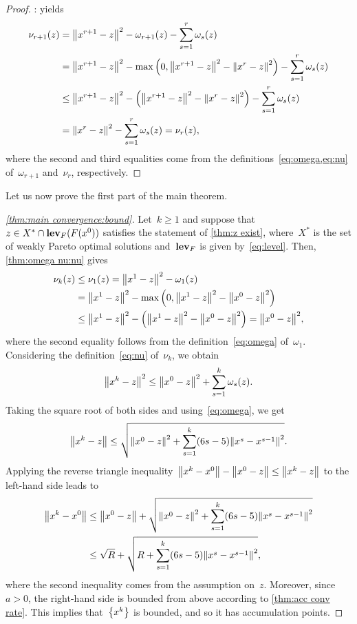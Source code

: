 \documentclass[../main]{subfiles}
\begin{document}
\begin{proof}
    :
     yields
    \[
        \begin{split}
            \nu_{r + 1}(z) &= \norm*{x^{r + 1} - z}^2 - \omega_{r + 1}(z) - \sum_{s = 1}^r \omega_s(z) \\
                           &= \norm*{x^{r + 1} - z}^2 - \max \left( 0, \norm*{x^{r + 1} - z}^2 - \norm*{x^r - z}^2 \right) - \sum_{s = 1}^{r} \omega_s(z) \\
                           &\le \norm*{x^{r + 1} - z}^2 - \left( \norm*{x^{r + 1} - z}^2 - \norm*{x^r - z}^2 \right) - \sum_{s = 1}^{r} \omega_s(z) \\
                           &= \norm*{x^r - z}^2 - \sum_{s = 1}^{r} \omega_s(z) = \nu_r(z) 
        ,\end{split}
    \] 
    where the second and third equalities come from the definitions~\cref{eq:omega,eq:nu} of~$\omega_{r + 1}$ and~$\nu_r$, respectively.
\end{proof}

Let us now prove the first part of the main theorem.
\begin{proof}[\cref{thm:main convergence:bound}]
    Let~$k \ge 1$ and suppose that~$z \in X^\ast \cap \level_F(F(x^0))$ satisfies the statement of \cref{thm:z exist}, where~$X^\ast$ is the set of weakly Pareto optimal solutions and~$\level_F$ is given by~\cref{eq:level}.
    Then, \cref{thm:omega nu:nu} gives
    \[
        \begin{split}
            \nu_k(z) &\le \nu_1(z) = \norm*{x^1 - z}^2 - \omega_1(z) \\
                           &= \norm*{x^1 - z}^2 - \max \left( 0, \norm*{x^1 - z}^2 - \norm*{x^0 - z}^2 \right) \\
                           &\le \norm*{x^1 - z}^2 - \left( \norm*{x^1 - z}^2 - \norm*{x^0 - z}^2 \right) = \norm*{x^0 - z}^2
        ,\end{split}
    \] 
    where the second equality follows from the definition~\cref{eq:omega} of~$\omega_1$.
    Considering the definition~\cref{eq:nu} of~$\nu_k$, we obtain
    \[
        \norm*{x^k - z}^2 \le \norm*{x^0 - z}^2 + \sum_{s = 1}^{k} \omega_s(z)
    .\] 
    Taking the square root of both sides and using~\cref{eq:omega}, we get
    \[
        \norm*{x^k - z} \le \sqrt{ \norm*{x^0 - z}^2 + \sum_{s = 1}^{k} (6s - 5) \norm*{x^s - x^{s - 1}}^2 }
    .\] 
    Applying the reverse triangle inequality~$\norm*{x^k - x^0} - \norm*{x^0 - z} \le \norm*{x^k - z}$ to the left-hand side leads to
    \begin{align}
        \norm*{x^k - x^0} &\le \norm*{x^0 - z} + \sqrt{ \norm*{x^0 - z}^2 + \sum_{s = 1}^{k} (6s - 5) \norm*{x^s - x^{s - 1}}^2 } \\
                          &\le \sqrt{R} + \sqrt{R + \sum_{s = 1}^{k} (6s - 5) \norm*{x^s - x^{s - 1}}^2}
    ,\end{align}
    where the second inequality comes from the assumption on~$z$.
    Moreover, since~$a > 0$, the right-hand side is bounded from above according to \cref{thm:acc conv rate}.
    This implies that~$\set*{x^k}$ is bounded, and so it has accumulation points.
\end{proof}
\end{document}
